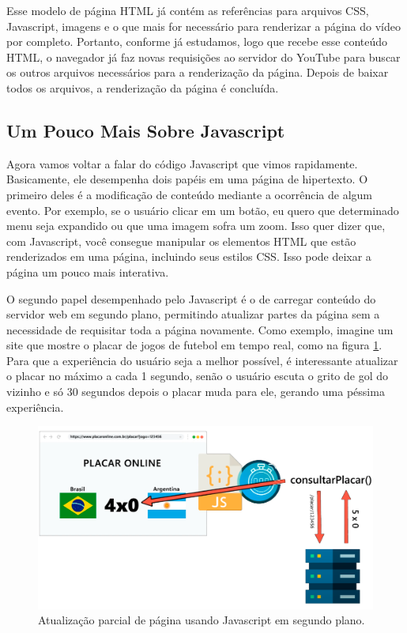 Esse modelo de página HTML já contém as referências para arquivos CSS, Javascript, imagens e o que mais for necessário para renderizar a página do vídeo por completo. Portanto, conforme já estudamos, logo que recebe esse conteúdo HTML, o navegador já faz novas requisições ao servidor do YouTube para buscar os outros arquivos necessários para a renderização da página. Depois de baixar todos os arquivos, a renderização da página é concluída.

\subsection{Um Pouco Mais Sobre Javascript}

Agora vamos voltar a falar do código Javascript que vimos rapidamente. Basicamente, ele desempenha dois papéis em uma página de hipertexto. O primeiro deles é a modificação de conteúdo mediante a ocorrência de algum evento. Por exemplo, se o usuário clicar em um botão, eu quero que determinado menu seja expandido ou que uma imagem sofra um zoom. Isso quer dizer que, com Javascript, você consegue manipular os elementos HTML que estão renderizados em uma página, incluindo seus estilos CSS. Isso pode deixar a página um pouco mais interativa.

O segundo papel desempenhado pelo Javascript é o de carregar conteúdo do servidor web em segundo plano, permitindo atualizar partes da página sem a necessidade de requisitar toda a página novamente. Como exemplo, imagine um site que mostre o placar de jogos de futebol em tempo real, como na figura \ref{fig:site_placar}. Para que a experiência do usuário seja a melhor possível, é interessante atualizar o placar no máximo a cada 1 segundo, senão o usuário escuta o grito de gol do vizinho e só 30 segundos depois o placar muda para ele, gerando uma péssima experiência.

\begin{figure}[htbp!]
    \centering
    \includegraphics[width=1\textwidth]{Images/chapter01/site_placar.png}
    \caption{Atualização parcial de página usando Javascript em segundo plano.}
    \label{fig:site_placar}
\end{figure}

